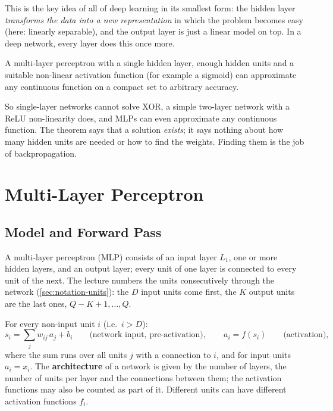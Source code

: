 \documentclass[11pt, oneside]{book}
\let\originalsection\section
\renewcommand{\section}{\Needspace{7\baselineskip}\originalsection}
\let\originalsubsection\subsection
\renewcommand{\subsection}{\Needspace{6\baselineskip}\originalsubsection}
\begin{document}
\begin{intbox}
This is the key idea of all of deep learning in its smallest form: the
hidden layer \emph{transforms the data into a new representation} in which
the problem becomes easy (here: linearly separable), and the output layer is
just a linear model on top. In a deep network, every layer does this once
more.
\end{intbox}

\begin{thmbox}[title={Universal function approximation (Hornik, 1989; Cybenko, 1989)}]
A multi-layer perceptron with a single hidden layer, enough hidden units and
a suitable non-linear activation function (for example a sigmoid) can
approximate any continuous function on a compact set to arbitrary accuracy.
\end{thmbox}

So single-layer networks cannot solve XOR, a simple two-layer network with a
ReLU non-linearity does, and MLPs can even approximate any continuous
function. The theorem says that a solution \emph{exists}; it says nothing
about how many hidden units are needed or how to find the weights. Finding
them is the job of backpropagation.


\section{Multi-Layer Perceptron}
\label{sec:mlp}

\subsection{Model and Forward Pass}

A multi-layer perceptron (MLP) consists of an input layer $L_1$, one or more
hidden layers, and an output layer; every unit of one layer is connected to
every unit of the next. The lecture numbers the units consecutively through
the network (\cref{sec:notation-units}): the $D$ input units come first,
the $K$ output units are the last ones, $Q - K + 1, \dots, Q$.

\begin{defbox}[title={Quantities of an MLP}]
For every non-input unit $i$ (i.e.\ $i > D$):
\[
  s_i = \sum_{j} w_{ij}\, a_j + b_i \qquad\text{(network input, pre-activation)},
  \qquad
  a_i = f(s_i) \qquad\text{(activation)},
\]
where the sum runs over all units $j$ with a connection to $i$, and for
input units $a_i = x_i$. The \textbf{architecture} of a network is given by
the number of layers, the number of units per layer and the connections
between them; the activation functions may also be counted as part of it.
Different units can have different activation functions $f_i$.
\end{defbox}
\end{document}
